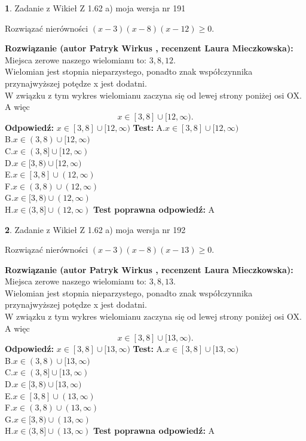 \documentclass[12pt, a4paper]{article}
\theoremstyle{definition} %
\newtheorem{zad}{}
\newcommand{\zadStart}[1]{\begin{zad}#1\newline}
\newcommand{\zadStop}{\end{zad}}
\newcommand{\rozwStart}[2]{\noindent \textbf{Rozwiązanie (autor #1 , recenzent #2): }\newline}
\newcommand{\rozwStop}{\newline}
\newcommand{\odpStart}{\noindent \textbf{Odpowiedź:}\newline}
\newcommand{\odpStop}{\newline}
\newcommand{\testStart}{\noindent \textbf{Test:}\newline}
\newcommand{\testStop}{\newline}
\newcommand{\kluczStart}{\noindent \textbf{Test poprawna odpowiedź:}\newline}
\newcommand{\kluczStop}{\newline}
\begin{document}
\zadStart{Zadanie z Wikieł Z 1.62 a) moja wersja nr 191}

Rozwiązać nierówności $(x-3)(x-8)(x-12)\ge0$.
\zadStop
\rozwStart{Patryk Wirkus}{Laura Mieczkowska}
Miejsca zerowe naszego wielomianu to: $3, 8, 12$.\\
Wielomian jest stopnia nieparzystego, ponadto znak współczynnika przy\linebreak najwyższej potędze x jest dodatni.\\ W związku z tym wykres wielomianu zaczyna się od lewej strony poniżej osi OX. A więc $$x \in [3,8] \cup [12,\infty).$$
\rozwStop
\odpStart
$x \in [3,8] \cup [12,\infty)$
\odpStop
\testStart
A.$x \in [3,8] \cup [12,\infty)$\\
B.$x \in (3,8) \cup [12,\infty)$\\
C.$x \in (3,8] \cup [12,\infty)$\\
D.$x \in [3,8) \cup [12,\infty)$\\
E.$x \in [3,8] \cup (12,\infty)$\\
F.$x \in (3,8) \cup (12,\infty)$\\
G.$x \in [3,8) \cup (12,\infty)$\\
H.$x \in (3,8] \cup (12,\infty)$
\testStop
\kluczStart
A
\kluczStop



\zadStart{Zadanie z Wikieł Z 1.62 a) moja wersja nr 192}

Rozwiązać nierówności $(x-3)(x-8)(x-13)\ge0$.
\zadStop
\rozwStart{Patryk Wirkus}{Laura Mieczkowska}
Miejsca zerowe naszego wielomianu to: $3, 8, 13$.\\
Wielomian jest stopnia nieparzystego, ponadto znak współczynnika przy\linebreak najwyższej potędze x jest dodatni.\\ W związku z tym wykres wielomianu zaczyna się od lewej strony poniżej osi OX. A więc $$x \in [3,8] \cup [13,\infty).$$
\rozwStop
\odpStart
$x \in [3,8] \cup [13,\infty)$
\odpStop
\testStart
A.$x \in [3,8] \cup [13,\infty)$\\
B.$x \in (3,8) \cup [13,\infty)$\\
C.$x \in (3,8] \cup [13,\infty)$\\
D.$x \in [3,8) \cup [13,\infty)$\\
E.$x \in [3,8] \cup (13,\infty)$\\
F.$x \in (3,8) \cup (13,\infty)$\\
G.$x \in [3,8) \cup (13,\infty)$\\
H.$x \in (3,8] \cup (13,\infty)$
\testStop
\kluczStart
A
\kluczStop
\end{document}
